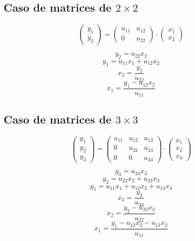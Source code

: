 \documentclass[10pt,a4paper,dvipdfmx]{article}
\begin{document}
\subsection{Caso de matrices de $2\times 2$ }
$$ \left( 
\begin{array}{c}
y_{1} \\
y_{2} 
 \end{array}
\right)
 = \left( 
\begin{array}{cc}
u_{{1}{1}} & u_{{1}{2}} \\
0 & u_{{2}{2}} 
 \end{array}
\right)
 \cdot \left( 
\begin{array}{c}
x_{1} \\
x_{2} 
 \end{array}
\right)
 $$
\begin{multicols}{2}
$$ y_{2} = u_{{2}{2}} x_{2} $$
$$ y_{1} = u_{{1}{1}} x_{1} + u_{{1}{2}} x_{2} $$
\vfill\null
\columnbreak
$$ x_{2} = \dfrac{y_{2}}{u_{{2}{2}}} $$
$$ x_{1} = \dfrac{y_{1}- u_{{1}{2}} x_{2}}{u_{{1}{1}}} $$
\end{multicols}
\subsection{Caso de matrices de $3\times 3$ }
$$ \left( 
\begin{array}{c}
y_{1} \\
y_{2} \\
y_{3} 
 \end{array}
\right)
 = \left( 
\begin{array}{ccc}
u_{{1}{1}} & u_{{1}{2}} & u_{{1}{3}} \\
0 & u_{{2}{2}} & u_{{2}{3}} \\
0 & 0 & u_{{3}{3}} 
 \end{array}
\right)
 \cdot \left( 
\begin{array}{c}
x_{1} \\
x_{2} \\
x_{3} 
 \end{array}
\right)
 $$
\begin{multicols}{2}
$$ y_{3} = u_{{3}{3}} x_{3} $$
$$ y_{2} = u_{{2}{2}} x_{2} + u_{{2}{3}} x_{3} $$
$$ y_{1} = u_{{1}{1}} x_{1} + u_{{1}{2}} x_{2} + u_{{1}{3}} x_{3} $$
\vfill\null
\columnbreak
$$ x_{3} = \dfrac{y_{3}}{u_{{3}{3}}} $$
$$ x_{2} = \dfrac{y_{2}- u_{{2}{3}} x_{3}}{u_{{2}{2}}} $$
$$ x_{1} = \dfrac{y_{1}- u_{{1}{2}} x_{2}- u_{{1}{3}} x_{3}}{u_{{1}{1}}} $$
\end{multicols}
\end{document}
